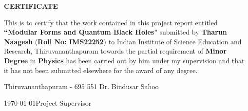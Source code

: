 \begin{center}
  {\Large{\bf{CERTIFICATE}}}
\end{center}

\vspace{2em}

This is to certify that the work contained in this project report entitled \textbf{``Modular Forms and Quantum Black Holes"}  submitted by \textbf{Tharun Naagesh} (\textbf{Roll No: IMS22252}) to Indian Institute of Science Education and Research, Thiruvananthapuram towards the partial requirement of {\bf Minor Degree} in \textbf{Physics} has been carried out by him under my supervision and that it has not been submitted elsewhere for the award of any degree.


\vspace{3em}

\noindent Thiruvananthapuram - 695 551 \hfill Dr. Bindusar Sahoo

\noindent \today \hfill Project Supervisor

\clearpage
